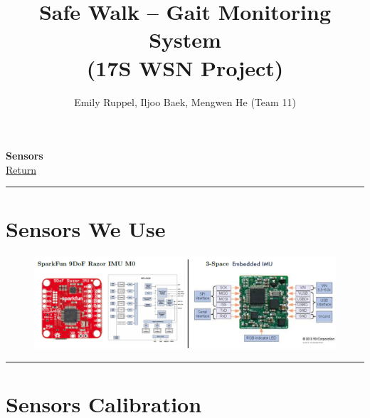 \documentclass[letterpaper,12pt]{article}
\title{\textbf{Safe Walk -- Gait Monitoring System\\\small (17S WSN Project)}}
\author{Emily Ruppel, Iljoo Baek, Mengwen He (Team 11)}
\newcommand{\panhline}{\begin{center}\rule{\textwidth}{1pt}\end{center}}
\begin{document}
\maketitle

\textbf{Sensors}\\
\href{../index.html}{Return}
\panhline
\section{Sensors We Use}

\begin{figure}[!h]
	\centering
	\includegraphics[width=20cm]{./imgs/imus.png}
\end{figure}

\panhline
\section{Sensors Calibration}
\end{document}
